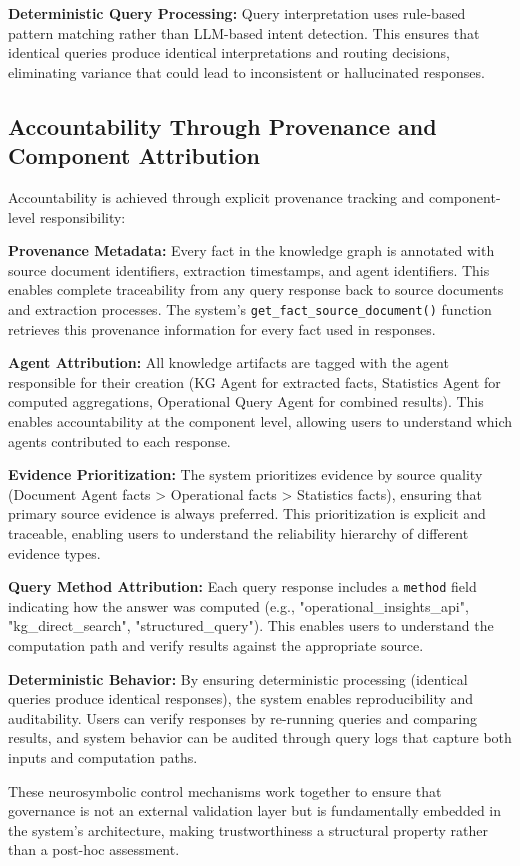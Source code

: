 \textbf{Deterministic Query Processing:} Query interpretation uses rule-based pattern matching rather than LLM-based intent detection. This ensures that identical queries produce identical interpretations and routing decisions, eliminating variance that could lead to inconsistent or hallucinated responses.

\subsection{Accountability Through Provenance and Component Attribution}

Accountability is achieved through explicit provenance tracking and component-level responsibility:

\textbf{Provenance Metadata:} Every fact in the knowledge graph is annotated with source document identifiers, extraction timestamps, and agent identifiers. This enables complete traceability from any query response back to source documents and extraction processes. The system's \texttt{get\_fact\_source\_document()} function retrieves this provenance information for every fact used in responses.

\textbf{Agent Attribution:} All knowledge artifacts are tagged with the agent responsible for their creation (KG Agent for extracted facts, Statistics Agent for computed aggregations, Operational Query Agent for combined results). This enables accountability at the component level, allowing users to understand which agents contributed to each response.

\textbf{Evidence Prioritization:} The system prioritizes evidence by source quality (Document Agent facts > Operational facts > Statistics facts), ensuring that primary source evidence is always preferred. This prioritization is explicit and traceable, enabling users to understand the reliability hierarchy of different evidence types.

\textbf{Query Method Attribution:} Each query response includes a \texttt{method} field indicating how the answer was computed (e.g., "operational\_insights\_api", "kg\_direct\_search", "structured\_query"). This enables users to understand the computation path and verify results against the appropriate source.

\textbf{Deterministic Behavior:} By ensuring deterministic processing (identical queries produce identical responses), the system enables reproducibility and auditability. Users can verify responses by re-running queries and comparing results, and system behavior can be audited through query logs that capture both inputs and computation paths.

These neurosymbolic control mechanisms work together to ensure that governance is not an external validation layer but is fundamentally embedded in the system's architecture, making trustworthiness a structural property rather than a post-hoc assessment.

